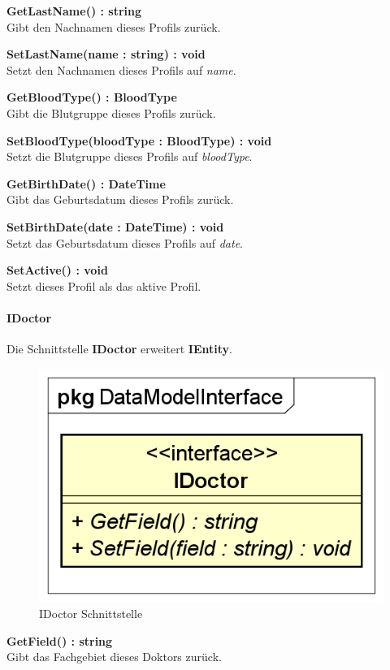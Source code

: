 \documentclass[a4paper]{scrreprt}
\begin{document}
\textbf{GetLastName() : string}\\
Gibt den Nachnamen dieses Profils zurück.

\textbf{SetLastName(name : string) : void}\\
Setzt den Nachnamen dieses Profils auf \textit{name}.

\textbf{GetBloodType() : BloodType}\\
Gibt die Blutgruppe dieses Profils zurück.

\textbf{SetBloodType(bloodType : BloodType) : void}\\
Setzt die Blutgruppe dieses Profils auf \textit{bloodType}.

\textbf{GetBirthDate() : DateTime}\\
Gibt das Geburtsdatum dieses Profils zurück.

\textbf{SetBirthDate(date : DateTime) : void}\\
Setzt das Geburtsdatum dieses Profils auf \textit{date}.

\textbf{SetActive() : void}\\
Setzt dieses Profil als das aktive Profil.

\paragraph{IDoctor}
Die Schnittstelle \textbf{IDoctor} erweitert \textbf{IEntity}.

\begin{figure}[H]
\centering
\includegraphics[width=0.75\textheight]{graphics/Klassendiagramme/Model/IDoctor.png}
\caption{IDoctor Schnittstelle}
\end{figure}
\textbf{GetField() : string}\\
Gibt das Fachgebiet dieses Doktors zurück.
\end{document}

